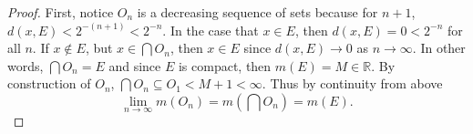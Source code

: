 \documentclass[12pt]{article}
\theoremstyle{definition}
\begin{document}
\begin{enumerate}
\begin{enumerate}[label=(\roman*)]
		            \begin{proof}
			            First, notice $O_n$ is a decreasing sequence of sets because for 
				    $n+1$, $d(x,E) < 2^{-(n+1)} < 2^{-n}$. In the case that $x \in E$,
				    then $d(x,E) = 0 < 2^{-n}$ for all $n$. If $x \notin E$, but 
				    $x\in \bigcap O_n$, then $x \in E$ since $d(x,E) \to 0$ as $n \to \infty$. In other words, $\bigcap O_n = E$ and since $E$ is compact, then $m(E) = M \in \mathbb{R}$. By construction of $O_n$, 
				    $\bigcap O_n \subseteq O_1 < M + 1 < \infty$. Thus by continuity from above 
				    $$\lim_{n\to \infty} m(O_n) = m(\bigcap O_n) = m(E).$$
		            \end{proof}
	      \end{enumerate}

\end{enumerate}
\end{document}
